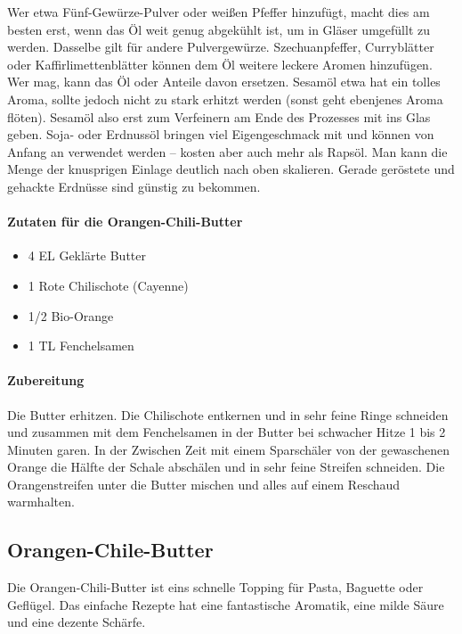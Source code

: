 Wer etwa Fünf-Gewürze-Pulver oder weißen Pfeffer hinzufügt, macht dies am 
besten erst, wenn das Öl weit genug abgekühlt ist, um in Gläser umgefüllt zu 
werden. Dasselbe gilt für andere Pulvergewürze.
Szechuanpfeffer, Curryblätter oder Kaffirlimettenblätter können dem Öl weitere 
leckere Aromen hinzufügen.
Wer mag, kann das Öl oder Anteile davon ersetzen. Sesamöl etwa hat ein tolles 
Aroma, sollte jedoch nicht zu stark erhitzt werden (sonst geht ebenjenes 
Aroma flöten). Sesamöl also erst zum Verfeinern am Ende des Prozesses mit 
ins Glas geben. Soja- oder Erdnussöl bringen viel Eigengeschmack mit und 
können von Anfang an verwendet werden – kosten aber auch mehr als Rapsöl.
Man kann die Menge der knusprigen Einlage deutlich nach oben skalieren. 
Gerade geröstete und gehackte Erdnüsse sind günstig zu bekommen.

\paragraph{Zutaten für die Orangen-Chili-Butter}

\begin{itemize}[noitemsep]
	\item 4 EL Geklärte Butter
	\item 1 Rote Chilischote (Cayenne)
	\item 1/2 Bio-Orange
	\item 1 TL Fenchelsamen
\end{itemize}

\paragraph{Zubereitung}

Die Butter erhitzen. Die Chilischote entkernen und in sehr feine Ringe schneiden und zusammen mit dem Fenchelsamen in der Butter bei 
schwacher Hitze 1 bis 2 Minuten garen. In der Zwischen Zeit mit einem Sparschäler von der gewaschenen Orange die Hälfte der Schale 
abschälen und in sehr feine Streifen schneiden. Die Orangenstreifen unter die Butter mischen und alles auf einem Reschaud warmhalten.

\subsection{Orangen-Chile-Butter}

Die Orangen-Chili-Butter ist eins schnelle Topping für Pasta, Baguette oder Geflügel. Das einfache Rezepte hat eine fantastische 
Aromatik, eine milde Säure und eine dezente Schärfe.

